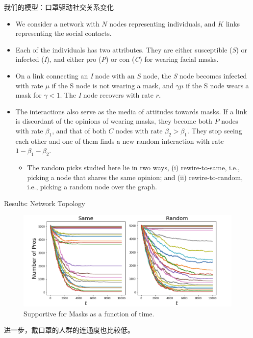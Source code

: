 \documentclass{beamer}
\begin{document}
\begin{frame}{我们的模型：口罩驱动社交关系变化}
    \begin{itemize}
        \item We consider a network with $N$ nodes representing individuals, and $K$ links representing the social contacts. 
        \item Each of the individuals has two attributes. They are either susceptible (\textit{S}) or infected (\textit{I}), and either pro (\textit{P}) or con (\textit{C}) for wearing facial masks. 
        \item On a link connecting an \textit{I} node with an \textit{S} node, the \textit{S} node becomes infected with rate $\mu$ if the S node is not wearing a mask, and $\gamma \mu$ if the S node wears a mask for $\gamma < 1$. The \textit{I} node recovers with rate $r$. 
        \item The interactions also serve as the media of attitudes towards masks. If a link is discordant of the opinions of wearing masks, they become both $P$ nodes with rate $\beta_1$, and that of both $C$ nodes with rate $\beta_2>\beta_1$. They stop seeing each other and one of them finds a new random interaction with rate $1-\beta_1-\beta_2$.
        \begin{itemize}
            \item The random picks studied here lie in two ways, (i) rewire-to-same, i.e., picking a node that shares the same opinion; and (ii) rewire-to-random, i.e., picking a random node over the graph. 
        \end{itemize}
    \end{itemize}
\end{frame}


\begin{frame}{Results: Network Topology}
    \begin{figure}
        \centering
        \includegraphics[width = 0.8\linewidth]{figs/截屏2020-07-10 下午7.57.32.png}
        \caption{Supportive for Masks as a function of time.}
    \end{figure}
    进一步，戴口罩的人群的连通度也比较低。
\end{frame}
\end{document}
